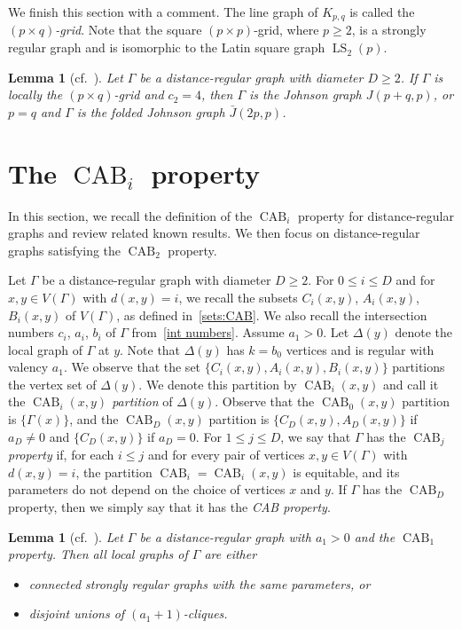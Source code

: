 \documentclass[11pt]{article}
\newtheorem{lemma}[theo]{Lemma}
\theoremstyle{definition}
\numberwithin{equation}{section}
\numberwithin{equation}{section}
\begin{document}
We finish this section with a comment.
The line graph of $K_{p,q}$ is called the \emph{$(p\times q)$-grid}.
Note that the square $(p\times p)$-grid, where $p\geqslant 2$, is a strongly regular graph and is isomorphic to the Latin square graph $\operatorname{LS}_2(p)$.

\begin{lemma}[{cf.~\cite[Proposition 4.1]{JK2003}}]\label{lem:grid}
Let $\Gamma$ be a distance-regular graph with diameter $D\geqslant 2$.
If $\Gamma$ is locally the $(p\times q)$-grid and $c_2=4$, then $\Gamma$ is the Johnson graph $J(p+q,p)$, or $p=q$ and $\Gamma$ is the folded Johnson graph $\bar{J}(2p,p)$.
\end{lemma}

\section{The \texorpdfstring{$\operatorname{CAB}_i$}{CABi} property}\label{Sec:CABprop}
In this section, we recall the definition of the $\operatorname{CAB}_i$ property for distance-regular graphs and review related known results.  
We then focus on distance-regular graphs satisfying the $\operatorname{CAB}_2$ property.

Let $\Gamma$ be a distance-regular graph with diameter $D \geqslant 2$. 
For $0 \leqslant i \leqslant D$ and for $x, y \in V(\Gamma)$ with $d(x, y) = i$, we recall the subsets $C_i(x, y)$, $A_i(x, y)$, $B_i(x, y)$ of $V(\Gamma)$, as defined in~\eqref{sets:CAB}. 
We also recall the intersection numbers $c_i$, $a_i$, $b_i$ of $\Gamma$ from~\eqref{int numbers}.
Assume $a_1 > 0$.
Let $\Delta(y)$ denote the local graph of $\Gamma$ at $y$.
Note that $\Delta(y)$ has $k = b_0$ vertices and is regular with valency $a_1$.
We observe that the set $\{C_i(x,y), A_i(x,y), B_i(x,y)\}$ partitions the vertex set of $\Delta(y)$.
We denote this partition by $\operatorname{CAB}_i(x, y)$ and call it the \emph{$\operatorname{CAB}_i(x, y)$ partition} of $\Delta(y)$. 
Observe that the $\operatorname{CAB}_0(x,y)$ partition is $\{\Gamma(x)\}$, and the $\operatorname{CAB}_D(x,y)$ partition is $\{C_D(x,y), A_D(x,y)\}$ if $a_D\ne 0$ and $\{C_D(x,y)\}$ if $a_D=0$. 
For $1 \leqslant j \leqslant D$, we say that $\Gamma$ has the \emph{$\operatorname{CAB}_j$ property} if, for each $i \leqslant j$ and for every pair of vertices $x, y \in V(\Gamma)$ with $d(x,y)=i$, the partition $\operatorname{CAB}_i=\operatorname{CAB}_i(x,y)$ is equitable, and its parameters do not depend on the choice of vertices $x$ and $y$.
If $\Gamma$ has the $\operatorname{CAB}_D$ property, then we simply say that it has the \emph{CAB property}.
\begin{lemma}[{cf.~\cite[Proposition 2.1]{JK2000-1}}]\label{CAB_1}
Let $\Gamma$ be a distance-regular graph with $a_1 > 0$ and the $\operatorname{CAB}_1$ property. 
Then all local graphs of $\Gamma$ are either
\begin{itemize}
  \item[\rm (i)] connected strongly regular graphs with the same parameters, or
  \item[\rm (ii)] disjoint unions of $(a_1 +1)$-cliques.
\end{itemize}
\end{lemma}
\end{document}
